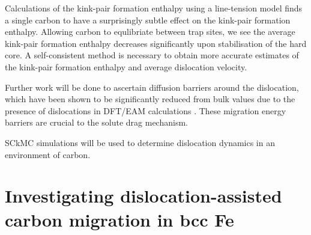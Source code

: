 \documentclass[a4paper,12pt,oneside,print,numbered,index,PageStyleIII]{PhDThesisPSnPDF}
\begin{document}
Calculations of the kink-pair formation enthalpy using a line-tension model finds a
single carbon to have a surprisingly subtle effect on the kink-pair formation
enthalpy. Allowing carbon to equlibriate between trap sites, we see the average
kink-pair formation enthalpy decreases significantly upon stabilisation of the hard
core. A self-consistent method is necessary to obtain more accurate estimates of the
kink-pair formation enthalpy and average dislocation velocity.

Further work will be done to ascertain diffusion barriers around the dislocation, which have been
shown to be significantly reduced from bulk values due to the presence of dislocations in DFT/EAM
calculations \cite{Nematollahi2016}. These migration energy barriers are crucial to the solute drag mechanism.

SCkMC simulations will be used to determine dislocation dynamics in an environment of carbon.


\clearpage
\chapter{Investigating dislocation-assisted carbon migration in bcc Fe}
\label{ch:FeC_carbon_migration}



\begin{spacing}{0.9}




\cleardoublepage





\end{spacing}
\end{document}
